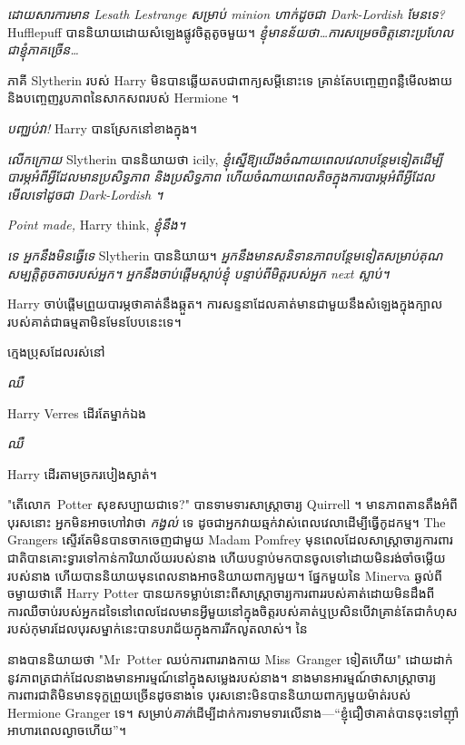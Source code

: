 \emph{ដោយសារការមាន Lesath Lestrange សម្រាប់ minion ហាក់ដូចជា Dark-Lordish មែនទេ?} Hufflepuff បាននិយាយដោយសំឡេងផ្លូវចិត្តតូចមួយ។ \emph{ខ្ញុំមានន័យថា…ការសម្រេចចិត្តនោះប្រហែលជាខ្ញុំភាគច្រើន…}

ភាគី Slytherin របស់ Harry មិនបានឆ្លើយតបជាពាក្យសម្ដីនោះទេ គ្រាន់តែបញ្ចេញពន្លឺមើលងាយ និងបញ្ចេញរូបភាពនៃសាកសពរបស់ Hermione ។

\emph{បញ្ឈប់វា!} Harry បានស្រែកនៅខាងក្នុង។

\emph{លើកក្រោយ} Slytherin បាននិយាយថា icily, \emph{ខ្ញុំស្នើឱ្យយើងចំណាយពេលវេលាបន្ថែមទៀតដើម្បីបារម្ភអំពីអ្វីដែលមានប្រសិទ្ធភាព និងប្រសិទ្ធភាព ហើយចំណាយពេលតិចក្នុងការបារម្ភអំពីអ្វីដែលមើលទៅដូចជា Dark-Lordish ។}

\emph{Point made,} Harry think, \emph{ខ្ញុំនឹង។}

\emph{ទេ អ្នកនឹងមិនធ្វើទេ} Slytherin បាននិយាយ។ \emph{ អ្នក​នឹង​មាន​សនិទានភាព​បន្ថែម​ទៀត​សម្រាប់​គុណសម្បតិ្ត​តូចតាច​របស់អ្នក។ អ្នកនឹងចាប់ផ្តើមស្តាប់ខ្ញុំ បន្ទាប់ពីមិត្តរបស់អ្នក \emph{next} ស្លាប់។}

Harry ចាប់ផ្តើមព្រួយបារម្ភថាគាត់នឹងឆ្កួត។ ការ​សន្ទនា​ដែល​គាត់​មាន​ជា​មួយ​នឹង​សំឡេង​ក្នុង​ក្បាល​របស់​គាត់​ជា​ធម្មតា​មិន​មែន​បែប​នេះ​ទេ។

ក្មេងប្រុសដែលរស់នៅ

\emph{ឈឺ}

Harry Verres ដើរតែម្នាក់ឯង

\emph{ឈឺ}

Harry ដើរតាមច្រករបៀងស្ងាត់។

\later

"តើលោក~Potter សុខសប្បាយជាទេ?" បានទាមទារសាស្រ្តាចារ្យ Quirrell ។ មានភាពតានតឹងអំពីបុរសនោះ អ្នកមិនអាចហៅវាថា \emph{កង្វល់} ទេ ដូចជាអ្នកវាយឆ្មក់វាស់ពេលវេលាដើម្បីធ្វើកូដកម្ម។ The Grangers ស្ទើរតែមិនបានចាកចេញជាមួយ Madam Pomfrey មុនពេលដែលសាស្រ្តាចារ្យការពារជាតិបានគោះទ្វារទៅកាន់ការិយាល័យរបស់នាង ហើយបន្ទាប់មកបានចូលទៅដោយមិនរង់ចាំចម្លើយរបស់នាង ហើយបាននិយាយមុនពេលនាងអាចនិយាយពាក្យមួយ។ ផ្នែកមួយនៃ Minerva ឆ្ងល់ពីចម្ងាយថាតើ Harry Potter បានយកទម្លាប់នោះពីសាស្រ្តាចារ្យការពាររបស់គាត់ដោយមិនដឹងពីការឈឺចាប់របស់អ្នកដទៃនៅពេលដែលមានអ្វីមួយនៅក្នុងចិត្តរបស់គាត់ឬប្រសិនបើវាគ្រាន់តែជាកំហុសរបស់កុមារដែលបុរសម្នាក់នេះបានបរាជ័យក្នុងការរីកលូតលាស់។ នៃ

នាងបាននិយាយថា "Mr~Potter ឈប់ការពាររាងកាយ Miss~Granger ទៀតហើយ" ដោយដាក់នូវភាពត្រជាក់ដែលនាងមានអារម្មណ៍នៅក្នុងសម្លេងរបស់នាង។ នាង​មាន​អារម្មណ៍​ថា​សាស្ត្រាចារ្យ​ការពារ​ជាតិ​មិន​មាន​ទុក្ខ​ព្រួយ​ច្រើន​ដូច​នាង​ទេ បុរស​នោះ​មិន​បាន​និយាយ​ពាក្យ​មួយ​ម៉ាត់​របស់ Hermione Granger ទេ។ សម្រាប់\emph{គាត់}ដើម្បីដាក់ការទាមទារលើនាង—“ខ្ញុំជឿថាគាត់បានចុះទៅញ៉ាំអាហារពេលល្ងាចហើយ”។

